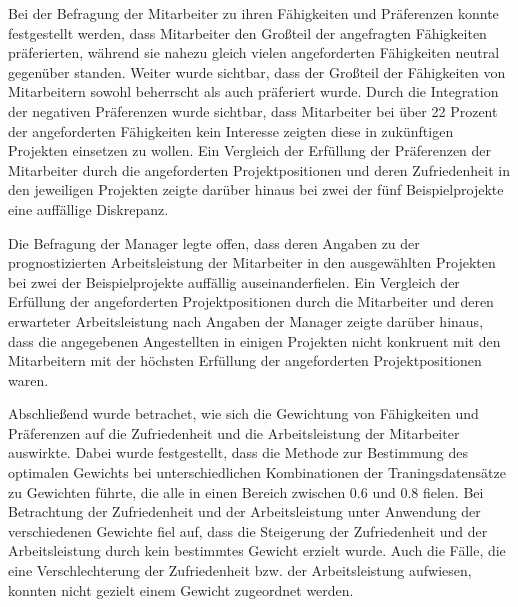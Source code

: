 Bei der Befragung der Mitarbeiter zu ihren Fähigkeiten und Präferenzen konnte festgestellt werden, dass Mitarbeiter den Großteil der angefragten Fähigkeiten präferierten, während sie nahezu gleich vielen angeforderten Fähigkeiten neutral gegenüber standen.
Weiter wurde sichtbar, dass der Großteil der Fähigkeiten von Mitarbeitern sowohl beherrscht als auch präferiert wurde.
Durch die Integration der negativen Präferenzen wurde sichtbar, dass Mitarbeiter bei über 22 Prozent der angeforderten Fähigkeiten kein Interesse zeigten diese in zukünftigen Projekten einsetzen zu wollen.
Ein Vergleich der Erfüllung der Präferenzen der Mitarbeiter durch die angeforderten Projektpositionen und deren Zufriedenheit in den jeweiligen Projekten zeigte darüber hinaus bei zwei der fünf Beispielprojekte eine auffällige Diskrepanz.

Die Befragung der Manager legte offen, dass deren Angaben zu der prognostizierten Arbeitsleistung der Mitarbeiter in den ausgewählten Projekten bei zwei der Beispielprojekte auffällig auseinanderfielen. 
Ein Vergleich der Erfüllung der angeforderten Projektpositionen durch die Mitarbeiter und deren erwarteter Arbeitsleistung nach Angaben der Manager zeigte darüber hinaus, dass die angegebenen Angestellten in einigen Projekten nicht konkruent mit den Mitarbeitern mit der höchsten Erfüllung der angeforderten Projektpositionen waren.

Abschließend wurde betrachet, wie sich die Gewichtung von Fähigkeiten und Präferenzen auf die Zufriedenheit und die Arbeitsleistung der Mitarbeiter auswirkte.
Dabei wurde festgestellt, dass die Methode zur Bestimmung des optimalen Gewichts bei unterschiedlichen Kombinationen der Traningsdatensätze zu Gewichten führte, die alle in einen Bereich zwischen 0.6 und 0.8 fielen.
Bei Betrachtung der Zufriedenheit und der Arbeitsleistung unter Anwendung der verschiedenen Gewichte fiel auf, dass die Steigerung der Zufriedenheit und der Arbeitsleistung durch kein bestimmtes Gewicht erzielt wurde.
Auch die Fälle, die eine Verschlechterung der Zufriedenheit bzw. der Arbeitsleistung aufwiesen, konnten nicht gezielt einem Gewicht zugeordnet werden.


